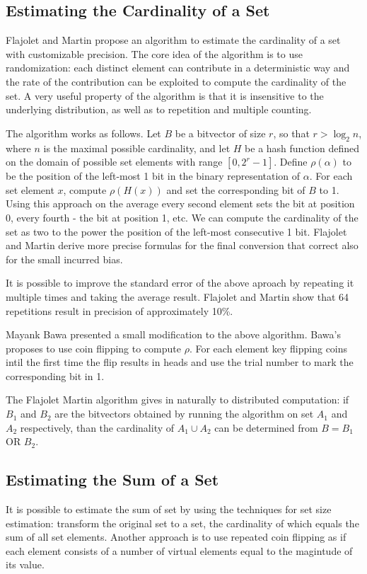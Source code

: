 \documentclass{article}
\begin{document}
\subsection{Estimating the Cardinality of a Set}
Flajolet and Martin propose an algorithm to estimate the cardinality
of a set with customizable precision. The core idea of the algorithm
is to use randomization: each distinct element can contribute in a
deterministic way and the rate of the contribution can be exploited to
compute the cardinality of the set. A very useful property of the
algorithm is that it is insensitive to the underlying
distribution, as well as to repetition and multiple counting.

The algorithm works as follows. Let $B$ be a bitvector of size $r$, so that $r
> \log_{2}{n}$, where $n$ is the maximal possible cardinality, and let
$H$ be a hash function defined on the domain of possible set elements
with range $[0, 2^r-1]$. Define $\rho(\alpha)$ to be the position of
the left-most 1 bit in the binary representation of $\alpha$. For each
set element $x$, compute $\rho(H(x))$ and set the corresponding bit of
$B$ to 1. Using this approach on the average every second element sets
the bit at position 0, every fourth - the bit at position 1, etc. We
can compute the cardinality of the set as two to the power the position of the
left-most consecutive 1 bit. Flajolet and Martin derive more precise
formulas for the final conversion that correct also for the small
incurred bias.

It is possible to improve the standard error of the above aproach by
repeating it multiple times and taking the average result. Flajolet
and Martin show that 64 repetitions result in precision of
approximately 10\%.

Mayank Bawa presented a small modification to the above
algorithm. Bawa's proposes to use coin flipping to compute $\rho$. For
each element key flipping coins intil the first time the flip results
in heads and use the trial number to mark the corresponding bit in 1. 

The Flajolet Martin algorithm gives in naturally to distributed
computation: if $B_1$ and $B_2$ are the bitvectors obtained by running
the algorithm on set $A_1$ and $A_2$ respectively, than the
cardinality of $A_1 \cup A_2$ can be determined from $B = B_1$ OR
$B_2$. 

\subsection{Estimating the Sum of a Set}
It is possible to estimate the sum of set by using the techniques for
set size estimation: transform the original set to a set, the
cardinality of which equals the sum of all set elements. Another
approach is to use repeated coin flipping as if each element consists
of a number of virtual elements equal to the magintude of its value.
\end{document}

